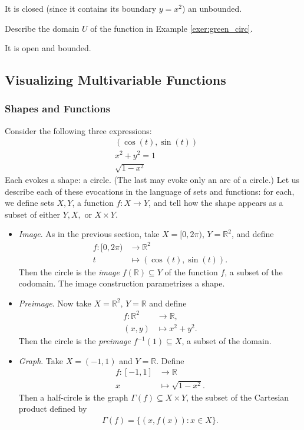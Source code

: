 \documentclass[12pt,letterpaper,reqno]{article}
\numberwithin{equation}{section}
\newcommand{\R}{\ensuremath{\mathbb R}}
\begin{document}
{{\color{red}
\begin{solution}
	It is closed (since it contains its boundary $y=x^2$) an unbounded. 
\end{solution}}

\begin{exercise}
Describe the domain $U$ of the function in Example	\ref{exer:green_circ}.
\end{exercise}

{\color{red}
\begin{solution}
	It is open and bounded. 
\end{solution}}

\subsection{Visualizing Multivariable Functions}
\subsubsection{Shapes and Functions}
Consider the following three expressions:
\begin{align*}
	&(\cos(t),\sin(t)) \\
	&x^2+y^2=1 \\
	&\sqrt{1-x^2}
\end{align*}
Each evokes a shape: a circle. (The last may evoke only an arc of a circle.) Let us describe each of these evocations in the language of sets and functions: for each, we define sets $X,Y$, a function $f:X \to Y$, and tell how the shape appears as a subset of either $Y,X,$ or $X \times Y$.

\begin{itemize}
	\item \emph{Image}. As in the previous section, take $X=[0,2\pi)$, $Y=\R^2$, and define
	\begin{align*}
		f:[0,2\pi) &\to \R^2 \\
		t &\mapsto (\cos(t),\sin(t)).
	\end{align*}
	Then the circle is the \emph{image} $f(\R) \subseteq Y$ of the function $f$, a subset of the codomain. The image construction parametrizes a shape.
	\item \emph{Preimage}. Now take $X=\R^2$, $Y=\R$ and define
	\begin{align*}
		f:\R^2 &\to \R, \\
		(x,y) &\mapsto x^2+y^2. 
	\end{align*}
	Then the circle is the \emph{preimage} $f^{-1}(1) \subseteq X$, a subset of the domain.
	\item \emph{Graph}. Take $X=(-1,1)$ and $Y=\R$. Define
	\begin{align*}
		f:[-1,1] &\to \R \\
		x &\mapsto \sqrt{1-x^2}.
	\end{align*}
	Then a half-circle is the graph $\Gamma(f) \subseteq X \times Y$, the subset of the Cartesian product defined by
	\begin{align*}
		\Gamma(f)=\{(x,f(x)): x \in X\}.
	\end{align*}
\end{itemize}

}
\end{document}
